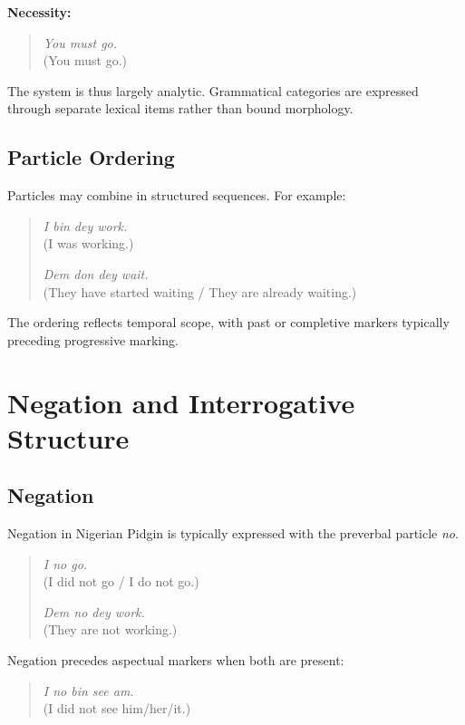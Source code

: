 \documentclass[12pt]{article}
\begin{document}
\textbf{Necessity:}

\begin{quote}
\textit{You must go.} \\
(You must go.)
\end{quote}

The system is thus largely analytic. Grammatical categories are expressed through separate lexical items rather than bound morphology.

\subsection{Particle Ordering}

Particles may combine in structured sequences. For example:

\begin{quote}
\textit{I bin dey work.} \\
(I was working.)

\textit{Dem don dey wait.} \\
(They have started waiting / They are already waiting.)
\end{quote}

The ordering reflects temporal scope, with past or completive markers typically preceding progressive marking.

\section{Negation and Interrogative Structure}

\subsection{Negation}

Negation in Nigerian Pidgin is typically expressed with the preverbal particle \textit{no}.

\begin{quote}
\textit{I no go.} \\
(I did not go / I do not go.)

\textit{Dem no dey work.} \\
(They are not working.)
\end{quote}

Negation precedes aspectual markers when both are present:

\begin{quote}
\textit{I no bin see am.} \\
(I did not see him/her/it.)
\end{quote}
\end{document}

